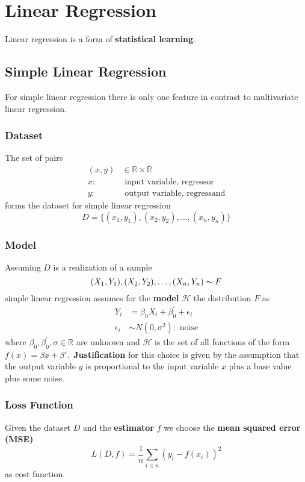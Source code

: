 \section{Linear Regression}
Linear regression is a form of \textbf{statistical learning}.
\subsection{Simple Linear Regression}
For simple linear regression there is only one feature in contrast to multivariate linear regression.

\subsubsection{Dataset}
The set of pairs
\begin{align*}
    (x,y) & \in\mathbb{R}\times\mathbb{R}       \\
    x:    & \text{ input variable, regressor}   \\
    y:    & \text{ output variable, regressand}
\end{align*}
forms the dataset for simple linear regression
\begin{equation*}
    D=\{(x_1,y_1),(x_2,y_2),\dots,(x_n,y_n)\}
\end{equation*}

\subsubsection{Model}
Assuming $D$ is a realization of a sample
\begin{equation*}
    (X_1,Y_1),(X_2,Y_2),\dots,(X_n,Y_n)\thicksim F
\end{equation*}
simple linear regression assumes for the \textbf{model} $\mathcal{H}$ the distribution $F$ as
\begin{align*}
    Y_i        & =\beta_0X_i+\beta^{\prime}_0+\epsilon_i \\
    \epsilon_i & \sim N(0,\sigma^2): \text{ noise}
\end{align*}
where $\beta_0,\beta^{\prime}_0,\sigma\in\mathbb{R}$ are unknown and $\mathcal{H}$ is the set of all functions of the form $f(x)=\beta x+\beta'$.\ \textbf{Justification} for this choice is given by the assumption that the output variable $y$ is proportional to the input variable $x$ plus a base value plus some noise.

\subsubsection{Loss Function}
Given the dataset $D$ and the \textbf{estimator} $f$ we choose the \textbf{mean squared error (MSE)}
\begin{equation*}
    L(D,f)=\frac{1}{n}\sum_{i\leq n}{\left(y_i-f(x_i)\right)}^2
\end{equation*}
as cost function.

